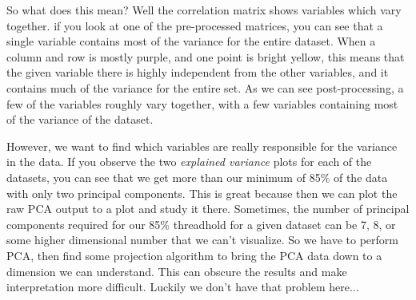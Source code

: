 \documentclass[20pt]{article} %
\begin{document}
So what does this mean? Well the correlation matrix shows variables which vary together.  if you look at one of the pre-processed matrices, you can see that a single variable contains most of the variance for the entire dataset.  When a column and row is mostly purple, and one point is bright yellow, this means that the given variable there is highly independent from the other variables, and it contains much of the variance for the entire set.  As we can see post-processing, a few of the variables roughly vary together, with a few variables containing most of the variance of the dataset.

However, we want to find which variables are really responsible for the variance in the data.  If you observe the two \textit{explained variance} plots for each of the datasets, you can see that we get more than our minimum of 85\% of the data with only two principal components.  This is great because then we can plot the raw PCA output to a plot and study it there.  Sometimes, the number of principal components required for our 85\% threadhold for a given dataset can be 7, 8, or some higher dimensional number that we can't visualize.  So we have to perform PCA, then find some projection algorithm to bring the PCA data down to a dimension we can understand.  This can obscure the results and make interpretation more difficult.  Luckily we don't have that problem here...
\end{document}

